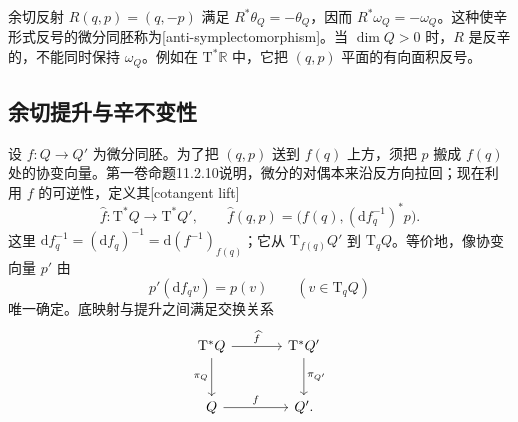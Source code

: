 \begin{example}
	\label{g4:exm:0702:fiber-reflection}
	余切反射 \(R(q,p)=(q,-p)\) 满足 \(R^*\theta_Q=-\theta_Q\)，因而 \(R^*\omega_Q=-\omega_Q\)。这种使辛形式反号的微分同胚称为[anti-symplectomorphism]。当 \(\dim Q>0\) 时，\(R\) 是反辛的，不能同时保持 \(\omega_Q\)。例如在 \(\mathrm{T}^*\mathbb R\) 中，它把 \((q,p)\) 平面的有向面积反号。
\end{example}

\subsection{余切提升与辛不变性}
\label{g4:subsec:0702:03}

设 \(f:Q\to Q'\) 为微分同胚。为了把 \((q,p)\) 送到 \(f(q)\) 上方，须把 \(p\) 搬成 \(f(q)\) 处的协变向量。第一卷命题11.2.10说明，微分的对偶本来沿反方向拉回；现在利用 \(f\) 的可逆性，定义其[cotangent lift]
\begin{equation}
	\label{g4:eq:0702:cotangent-lift}
	\widehat f:\mathrm{T}^*Q\longrightarrow\mathrm{T}^*Q',
	\qquad
	\widehat f(q,p)
	=\bigl(f(q),(\mathrm{d}f_q^{-1})^*p\bigr).
\end{equation}
这里 \(\mathrm{d}f_q^{-1}=(\mathrm{d}f_q)^{-1}
=\mathrm{d}(f^{-1})_{f(q)}\)；它从 \(\mathrm{T}_{f(q)}Q'\) 到 \(\mathrm{T}_qQ\)。等价地，像协变向量 \(p'\) 由
\[
	p'(\mathrm{d}f_qv)=p(v)\qquad(v\in\mathrm{T}_qQ)
\]
唯一确定。底映射与提升之间满足交换关系
\[
	\begin{tikzcd}[column sep=large,row sep=large]
		\mathrm{T}^*Q \arrow[r,"\widehat f"] \arrow[d,swap,"\pi_Q"]
		& \mathrm{T}^*Q' \arrow[d,"\pi_{Q'}"]\\
		Q \arrow[r,"f"] & Q'.
	\end{tikzcd}
\]

